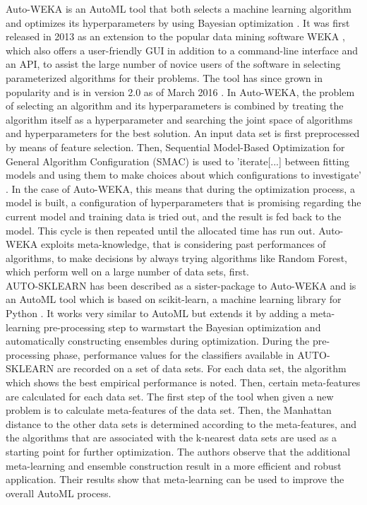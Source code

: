 Auto-WEKA is an AutoML tool that both selects a machine learning algorithm and optimizes its hyperparameters by using Bayesian optimization \cite{thornton2013auto}. It was first released in 2013 as an extension to the popular data mining software WEKA \cite{hall2009weka}, which also offers a user-friendly GUI in addition to a command-line interface and an API, to assist the large number of novice users of the software in selecting parameterized algorithms for their problems. The tool has since grown in popularity and is in version 2.0 as of March 2016 \cite{kotthoff2016auto}. In Auto-WEKA, the problem of selecting an algorithm and its hyperparameters is combined by treating the algorithm itself as a hyperparameter and searching the joint space of algorithms and hyperparameters for the best solution. An input data set is first preprocessed by means of feature selection. Then, Sequential Model-Based Optimization for General Algorithm Configuration (SMAC) is used to 'iterate[...] between fitting models and using them to make choices about which configurations to investigate' \cite{hutter2011sequential}. In the case of Auto-WEKA, this means that during the optimization process, a model is built, a configuration of hyperparameters that is promising regarding the current model and training data is tried out, and the result is fed back to the model. This cycle is then repeated until the allocated time has run out. Auto-WEKA exploits meta-knowledge, that is considering past performances of algorithms, to make decisions by always trying algorithms like Random Forest, which perform well on a large number of data sets, first. \\

AUTO-SKLEARN has been described as a sister-package to Auto-WEKA and is an AutoML tool which is based on scikit-learn, a machine learning library for Python \cite{feurer2015efficient}. It works very similar to AutoML but extends it by adding a meta-learning pre-processing step to warmstart the Bayesian optimization and automatically constructing ensembles during optimization. During the pre-processing phase, performance values for the classifiers available in AUTO-SKLEARN are recorded on a set of data sets. For each data set, the algorithm which shows the best empirical performance is noted. Then, certain meta-features are calculated for each data set. The first step of the tool when given a new problem is to calculate meta-features of the data set. Then, the Manhattan distance to the other data sets is determined according to the meta-features, and the algorithms that are associated with the k-nearest data sets are used as a starting point for further optimization. The authors observe that the additional meta-learning and ensemble construction result in a more efficient and robust application. Their results show that meta-learning can be used to improve the overall AutoML process.\\

